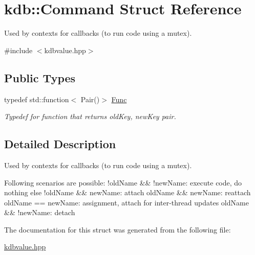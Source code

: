 \hypertarget{structkdb_1_1Command}{}\section{kdb\+:\+:Command Struct Reference}
\label{structkdb_1_1Command}


Used by contexts for callbacks (to run code using a mutex).  




{\ttfamily \#include $<$kdbvalue.\+hpp$>$}

\subsection*{Public Types}
\begin{DoxyCompactItemize}
\item 
\mbox{\label{structkdb_1_1Command_aa49d4f3541e7b5298ae94dfe9c88a67a}} 
typedef std\+::function$<$ Pair()$>$ \hyperlink{structkdb_1_1Command_aa49d4f3541e7b5298ae94dfe9c88a67a}{Func}
\begin{DoxyCompactList}\small\item\em Typedef for function that returns old\+Key, new\+Key pair. \end{DoxyCompactList}\end{DoxyCompactItemize}


\subsection{Detailed Description}
Used by contexts for callbacks (to run code using a mutex). 

Following scenarios are possible\+: !old\+Name \&\& !new\+Name\+: execute code, do nothing else !old\+Name \&\& new\+Name\+: attach old\+Name \&\& new\+Name\+: reattach old\+Name == new\+Name\+: assignment, attach for inter-\/thread updates old\+Name \&\& !new\+Name\+: detach 

The documentation for this struct was generated from the following file\+:\begin{DoxyCompactItemize}
\item 
\hyperlink{kdbvalue_8hpp}{kdbvalue.\+hpp}\end{DoxyCompactItemize}
